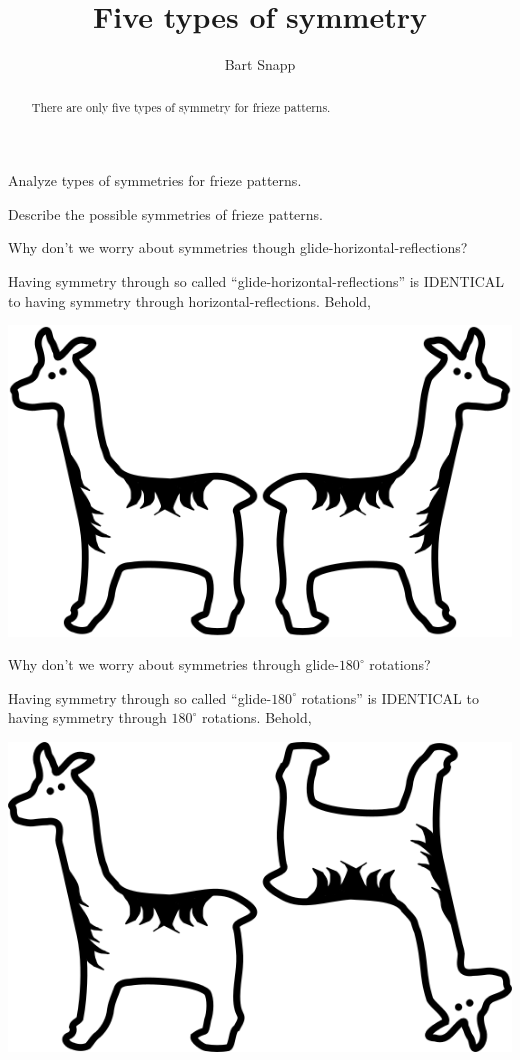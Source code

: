 \documentclass[noauthor,nooutcomes,12pt,hints,handout]{ximera}
\author{Bart Snapp}
\title{Five types of symmetry}
\begin{document}
\begin{abstract}
  There are only five types of symmetry for frieze patterns.
\end{abstract}
\maketitle

\begin{listOutcomes}
\item Analyze types of symmetries for frieze patterns.
\item Describe the possible symmetries of frieze patterns.
\end{listOutcomes}



\mynewpage


\begin{question}
  Why don't we worry about symmetries though
  glide-horizontal-reflections?
  \begin{freeResponse}
    Having symmetry through so called ``glide-horizontal-reflections''
    is IDENTICAL to having symmetry through
    horizontal-reflections. Behold,
    \begin{center}
      \includegraphics[width=.3\textwidth]{llamaGHF.png}
    \end{center}
  \end{freeResponse}
\end{question}
\mynewpage

\begin{question}
  Why don't we worry about symmetries through glide-$180^\circ$
  rotations?
  \begin{freeResponse}
    Having symmetry through so called ``glide-$180^\circ$ rotations''
    is IDENTICAL to having symmetry through
    $180^\circ$ rotations. Behold,
    \begin{center}
      \includegraphics[width=.3\textwidth]{llamaGR.png}
    \end{center}
  \end{freeResponse}
\end{question}
\mynewpage
\end{document}
